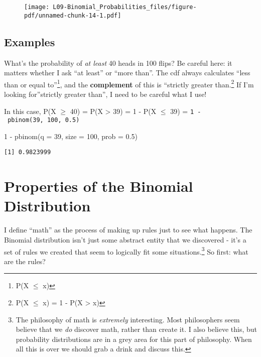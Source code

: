 \documentclass[
  letterpaper,
  DIV=11,
  numbers=noendperiod]{scrreprt}
\newenvironment{Shaded}{\begin{snugshade}}{\end{snugshade}}
\newcommand{\AttributeTok}[1]{\textcolor[rgb]{0.40,0.45,0.13}{#1}}
\newcommand{\DecValTok}[1]{\textcolor[rgb]{0.68,0.00,0.00}{#1}}
\newcommand{\FloatTok}[1]{\textcolor[rgb]{0.68,0.00,0.00}{#1}}
\newcommand{\FunctionTok}[1]{\textcolor[rgb]{0.28,0.35,0.67}{#1}}
\newcommand{\NormalTok}[1]{\textcolor[rgb]{0.00,0.23,0.31}{#1}}
\newcommand{\SpecialCharTok}[1]{\textcolor[rgb]{0.37,0.37,0.37}{#1}}
\begin{document}
\begin{figure}[H]

{\centering \texttt{[image: L09-Binomial\_Probabilities\_files/figure-pdf/unnamed-chunk-14-1.pdf]}

}

\end{figure}

\hypertarget{examples-3}{%
\subsection{Examples}\label{examples-3}}

What's the probability of \emph{at least} 40 heads in 100 flips? Be
careful here: it matters whether I ask ``at least'' or ``more than''.
The cdf always calculates ``less than or equal to''\footnote{P(X \(\le\)
  x)}, and the \textbf{complement} of this is ``strictly greater
than.\footnote{P(X \(\le\) x) = 1 - P(X \textgreater{} x)} If I'm
looking for''strictly greater than'', I need to be careful what I use!

In this case, P(X \(\ge\) 40) = P(X \textgreater{} 39) = 1 - P(X \(\le\)
39) = \texttt{1\ -\ pbinom(39,\ 100,\ 0.5)}

\begin{Shaded}
\begin{Highlighting}[]
\DecValTok{1} \SpecialCharTok{{-}} \FunctionTok{pbinom}\NormalTok{(}\AttributeTok{q =} \DecValTok{39}\NormalTok{, }\AttributeTok{size =} \DecValTok{100}\NormalTok{, }\AttributeTok{prob =} \FloatTok{0.5}\NormalTok{)}
\end{Highlighting}
\end{Shaded}

\begin{verbatim}
[1] 0.9823999
\end{verbatim}

\hypertarget{properties-of-the-binomial-distribution}{%
\section{Properties of the Binomial
Distribution}\label{properties-of-the-binomial-distribution}}

I define ``math'' as the process of making up rules just to see what
happens. The Binomial distribution isn't just some abstract entity that
we discovered - it's a set of rules we created that seem to logically
fit some situations.\footnote{The philosophy of math is \emph{extremely}
  interesting. Most philosophers seem believe that we \emph{do} discover
  math, rather than create it. I also believe this, but probability
  distributions are in a grey area for this part of philosophy. When all
  this is over we should grab a drink and discuss this.} So first: what
are the rules?
\end{document}
